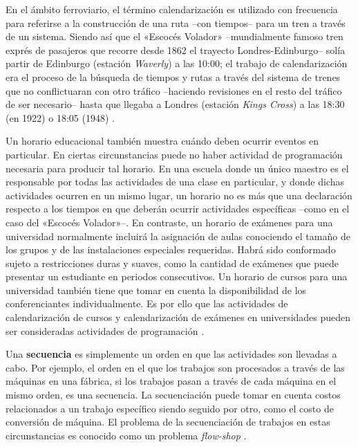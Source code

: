 \documentclass[spanish,draft,12pt,headsepline,footsepline,paper=letter]{scrreprt}
\begin{document}
En el ámbito ferroviario, el término calendarización es utilizado con frecuencia para referirse a la construcción de una ruta –con tiempos– para un tren a través de un sistema. Siendo así que el «Escocés Volador» –mundialmente famoso tren exprés de pasajeros que recorre desde 1862 el trayecto Londres-Edinburgo– solía partir de Edinburgo (estación \textit{Waverly}) a las 10:00; el trabajo de calendarización era el proceso de la búsqueda de tiempos y rutas a través del sistema de trenes que no conflictuaran con otro tráfico –haciendo revisiones en el resto del tráfico de ser necesario– hasta que llegaba a Londres (estación \textit{Kings Cross}) a las 18:30 (en 1922) o 18:05 (1948) 
\citep[p.~48, 49]{wren95scheduling-timetabling}.

Un horario educacional también muestra cuándo deben ocurrir eventos en particular. En ciertas circunstancias puede no haber actividad de programación necesaria para producir tal horario. En una escuela donde un único maestro es el responsable por todas las actividades de una clase en particular, y donde dichas actividades ocurren en un mismo lugar, un horario no es más que una declaración respecto a los tiempos en que deberán ocurrir actividades específicas –como en el caso del «Escocés Volador»–.
%
En contraste, un horario de exámenes para una universidad normalmente incluirá la asignación de aulas conociendo el tamaño de los grupos y de las instalaciones especiales requeridas. Habrá sido conformado sujeto a restricciones duras y suaves, como la cantidad de exámenes que puede presentar un estudiante en periodos consecutivos. Un horario de cursos para una universidad también tiene que tomar en cuenta la disponibilidad de los conferenciantes individualmente.
%
Es por ello que las actividades de calendarización de cursos y calendarización de exámenes en universidades pueden ser consideradas actividades de programación \citep[p.~49]{wren95scheduling-timetabling}. 

Una \textbf{secuencia} es simplemente un orden en que las actividades son llevadas a cabo. Por ejemplo, el orden en el que los trabajos son procesados a través de las máquinas en una fábrica, si los trabajos pasan a través de cada máquina en el mismo orden, es una secuencia. La secuenciación puede tomar en cuenta costos relacionados a un trabajo específico siendo seguido por otro, como el costo de conversión de máquina. El problema de la secuenciación de trabajos en estas circunstancias es conocido como un problema \textit{flow-shop} \citep[p.~49]{wren95scheduling-timetabling}. 
\end{document}
